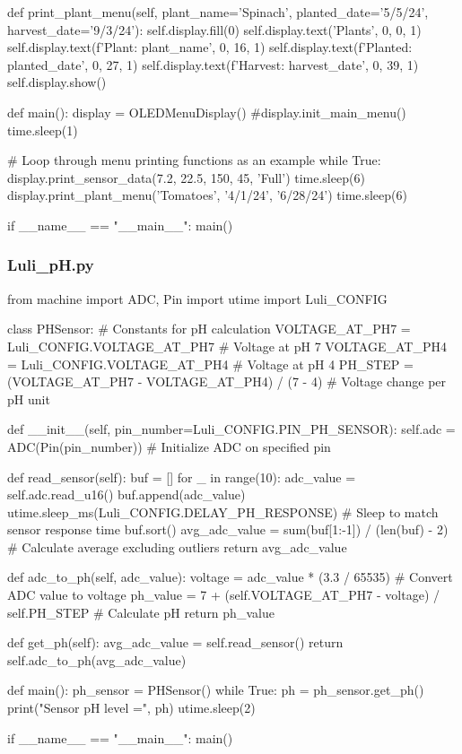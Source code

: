 \documentclass[12pt]{article} %
\begin{document}
\begin{pythoncode}[caption={Pico W OLED Display Code}]
        def print_plant_menu(self, plant_name='Spinach', planted_date='5/5/24', harvest_date='9/3/24'):
            self.display.fill(0)
            self.display.text('Plants', 0, 0, 1)
            self.display.text(f'Plant: {plant_name}', 0, 16, 1)
            self.display.text(f'Planted: {planted_date}', 0, 27, 1)
            self.display.text(f'Harvest: {harvest_date}', 0, 39, 1)
            self.display.show()
    
    def main():
        display = OLEDMenuDisplay()
        #display.init_main_menu()
        time.sleep(1)
    
        # Loop through menu printing functions as an example
        while True:
            display.print_sensor_data(7.2, 22.5, 150, 45, 'Full')
            time.sleep(6)
            display.print_plant_menu('Tomatoes', '4/1/24', '6/28/24')
            time.sleep(6)
    
    if __name__ == "__main__":
        main()    
\end{pythoncode}
\subsubsection{Luli\_pH.py}
\begin{pythoncode}[caption={Pico W pH Sensor Code}]
    from machine import ADC, Pin
    import utime
    import Luli_CONFIG
    
    class PHSensor:
        # Constants for pH calculation
        VOLTAGE_AT_PH7 = Luli_CONFIG.VOLTAGE_AT_PH7  # Voltage at pH 7
        VOLTAGE_AT_PH4 = Luli_CONFIG.VOLTAGE_AT_PH4  # Voltage at pH 4
        PH_STEP = (VOLTAGE_AT_PH7 - VOLTAGE_AT_PH4) / (7 - 4)  # Voltage change per pH unit
    
        def __init__(self, pin_number=Luli_CONFIG.PIN_PH_SENSOR):
            self.adc = ADC(Pin(pin_number))  # Initialize ADC on specified pin
    
        def read_sensor(self):
            buf = []
            for _ in range(10):
                adc_value = self.adc.read_u16()
                buf.append(adc_value)
                utime.sleep_ms(Luli_CONFIG.DELAY_PH_RESPONSE)  # Sleep to match sensor response time
            buf.sort()
            avg_adc_value = sum(buf[1:-1]) / (len(buf) - 2)  # Calculate average excluding outliers
            return avg_adc_value
    
        def adc_to_ph(self, adc_value):
            voltage = adc_value * (3.3 / 65535)  # Convert ADC value to voltage
            ph_value = 7 + (self.VOLTAGE_AT_PH7 - voltage) / self.PH_STEP  # Calculate pH
            return ph_value
    
        def get_ph(self):
            avg_adc_value = self.read_sensor()
            return self.adc_to_ph(avg_adc_value)
    
    def main():
        ph_sensor = PHSensor()
        while True:
            ph = ph_sensor.get_ph()
            print("Sensor pH level =", ph)
            utime.sleep(2)
    
    if __name__ == "__main__":
        main()
        
\end{pythoncode}
\end{document}
